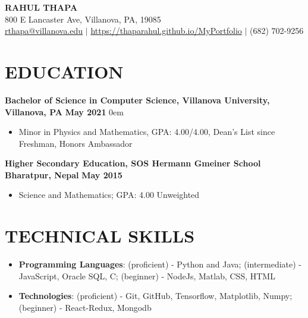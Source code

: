 \documentclass[letterpaper,11pt]{article}
\begin{document}
\begin{center}
    {\LARGE \textbf{RAHUL THAPA}}\\
800 E Lancaster Ave, Villanova, PA, 19085\\
  \href{mailto:rthapa@villanova.edu}{rthapa@villanova.edu} $\vert$ \href{https://thaparahul.github.io/MyPortfolio}{https://thaparahul.github.io/MyPortfolio} $\vert$ (682) 702-9256 \\
\end{center} 



\section{\textbf{EDUCATION}}
      \textbf{Bachelor of Science in Computer Science, Villanova University, Villanova, PA}
      \null\hfill {\textbf{May 2021}}
      \itemsep0em
      \begin{itemize}
      \itemsep0em
          \item \normalfont Minor in Physics and Mathematics, GPA: 4.00/4.00, Dean's List since Freshman, Honors Ambassador
      \end{itemize}
      {\textbf{Higher Secondary Education, SOS Hermann Gmeiner School Bharatpur, Nepal}}
      \null\hfill {\textbf{May 2015}}
      \begin{itemize}
      \itemsep0em
          \item {\normalfont Science and Mathematics;  GPA: 4.00 Unweighted}
      \end{itemize}
  
\section{\textbf{TECHNICAL SKILLS}}
    \begin{itemize}
    \itemsep0em
        \item 
            {\textbf{Programming Languages}: (proficient) - Python and Java; (intermediate) - JavaScript, Oracle SQL, C; (beginner) - NodeJs, Matlab, CSS, HTML}
        \item
            {\textbf{Technologies}: (proficient) - Git, GitHub, Tensorflow, Matplotlib, Numpy; (beginner) -  React-Redux, Mongodb}
    \end{itemize}


  
\end{document}
